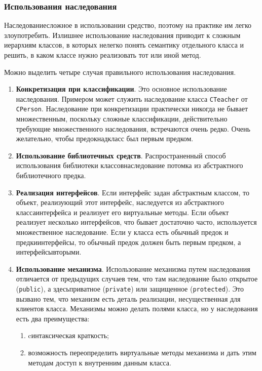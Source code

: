 \newpage
\subsubsection{Использования наследования}

Наследование\mdash сложное в использовании средство, поэтому на практике им легко злоупотребить. Излишнее использование наследования приводит к сложным иерархиям классов, в которых нелегко понять семантику отдельного класса и решить, в каком классе нужно реализовать тот или иной метод.

Можно выделить четыре случая правильного использования наследования.

\begin{enumerate}
\item \textbf{Конкретизация при классификации}. Это основное использование наследования. Примером может служить наследование класса \lstinline|CTeacher| от \lstinline|CPerson|. Наследование при конкретизации практически никогда не бывает множественным, поскольку сложные классификации, действительно требующие множественного наследования, встречаются очень редко. Очень желательно, чтобы предок\sdash надкласс был первым предком.
%
\item \textbf{Использование библиотечных средств}. Распространенный способ использования библиотеки классов\mdash наследование потомка из абстрактного библиотечного предка.
%
\item \textbf{Реализация интерфейсов}. Если интерфейс задан абстрактным классом, то объект, реализующий этот интерфейс, наследуется из абстрактного класса\mdash интерфейса и реализует его виртуальные методы. Если объект реализует несколько интерфейсов, что бывает достаточно часто, используется множественное наследование. Если у класса есть обычный предок и предки\mdash интерфейсы, то обычный предок должен быть первым предком, а интерфейсы\mdash вторыми.
%
\item \textbf{Использование механизма}. Использование механизма путем наследования отличается от предыдущих случаев тем, что там наследование было открытое (\lstinline|public|), а здесь\mdash приватное (\lstinline|private|) или защищенное (\lstinline|protected|). Это вызвано тем, что механизм есть деталь реализации, несущественная для клиентов класса. Механизмы можно делать полями класса, но у наследования есть два преимущества:
	\begin{enumerate}
	\item cинтаксическая краткость;
	\item возможность переопределить виртуальные методы механизма и дать этим методам доступ к внутренним данным класса.
	\end{enumerate}
\end{enumerate}

